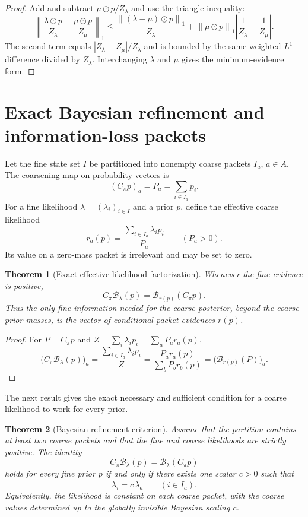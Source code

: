 \documentclass[11pt,a4paper]{article}
\newtheorem{theorem}{Theorem}[section]
\theoremstyle{definition}
\theoremstyle{remark}
\newcommand{\cB}{\mathcal B}
\newcommand{\norm}[1]{\left\lVert#1\right\rVert}
\begin{document}
\begin{proof}
Add and subtract $\mu\odot p/Z_\lambda$ and use the triangle inequality:
\[
\norm{\frac{\lambda\odot p}{Z_\lambda}-\frac{\mu\odot p}{Z_\mu}}_1
\le
\frac{\norm{(\lambda-\mu)\odot p}_1}{Z_\lambda}
+
\norm{\mu\odot p}_1\left|\frac1{Z_\lambda}-\frac1{Z_\mu}\right|.
\]
The second term equals $|Z_\lambda-Z_\mu|/Z_\lambda$ and is bounded by the same weighted $L^1$ difference divided by $Z_\lambda$. Interchanging $\lambda$ and $\mu$ gives the minimum-evidence form.
\end{proof}

\section{Exact Bayesian refinement and information-loss packets}\label{core:section:08}

Let the fine state set $I$ be partitioned into nonempty coarse packets $I_a$, $a\in A$.  The coarsening map on probability vectors is
\[
(C_\pi p)_a=P_a=\sum_{i\in I_a}p_i.
\]
For a fine likelihood $\lambda=(\lambda_i)_{i\in I}$ and a prior $p$, define the effective coarse likelihood
\[
r_a(p)
=
\frac{\sum_{i\in I_a}\lambda_i p_i}{P_a}
\qquad(P_a>0).
\]
Its value on a zero-mass packet is irrelevant and may be set to zero.

\begin{theorem}[Exact effective-likelihood factorization]\label{core:record:020}
Whenever the fine evidence is positive,
\[
\boxed{
C_\pi\cB_\lambda(p)
=
\cB_{r(p)}(C_\pi p).}
\]
Thus the only fine information needed for the coarse posterior, beyond the coarse prior masses, is the vector of conditional packet evidences $r(p)$.
\end{theorem}

\begin{proof}
For $P=C_\pi p$ and $Z=\sum_i\lambda_ip_i=\sum_aP_ar_a(p)$,
\[
\bigl(C_\pi\cB_\lambda(p)\bigr)_a
=
\frac{\sum_{i\in I_a}\lambda_ip_i}{Z}
=
\frac{P_ar_a(p)}{\sum_bP_br_b(p)}
=
\bigl(\cB_{r(p)}(P)\bigr)_a.
\]
\end{proof}

The next result gives the exact necessary and sufficient condition for a coarse likelihood to work for every prior.

\begin{theorem}[Bayesian refinement criterion]\label{core:record:021}
Assume that the partition contains at least two coarse packets and that the fine and coarse likelihoods are strictly positive.  The identity
\[
\boxed{
C_\pi\cB_\lambda(p)
=
\cB_{\bar\lambda}(C_\pi p)}
\]
holds for every fine prior $p$ if and only if there exists one scalar $c>0$ such that
\[
\boxed{
\lambda_i=c\,\bar\lambda_a
\qquad(i\in I_a).}
\]
Equivalently, the likelihood is constant on each coarse packet, with the coarse values determined up to the globally invisible Bayesian scaling $c$.
\end{theorem}
\end{document}

